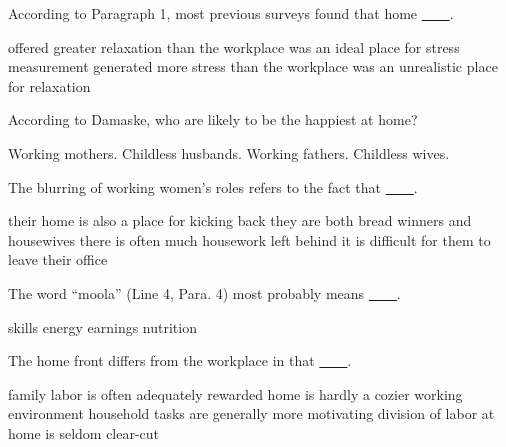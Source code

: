 \item According to Paragraph 1, most previous surveys found that home \uline{~~~~}.
\begin{tasks}
	\task offered greater relaxation than the workplace
	\task was an ideal place for stress measurement
	\task generated more stress than the workplace
	\task was an unrealistic place for relaxation
\end{tasks}
\item According to Damaske, who are likely to be the happiest at home?
\begin{tasks}
	\task Working mothers.
	\task Childless husbands.
	\task Working fathers.
	\task Childless wives.
\end{tasks}
\item The blurring of working women's roles refers to the fact that \uline{~~~~}.
\begin{tasks}
	\task their home is also a place for kicking back
	\task they are both bread winners and housewives
	\task there is often much housework left behind
	\task it is difficult for them to leave their office
\end{tasks}
\item The word ``moola'' (Line 4, Para. 4) most probably means \uline{~~~~}.
\begin{tasks}
	\task skills
	\task energy
	\task earnings
	\task nutrition
\end{tasks}
\item The home front differs from the workplace in that \uline{~~~~}.
\begin{tasks}
	\task family labor is often adequately rewarded
	\task home is hardly a cozier working environment
	\task household tasks are generally more motivating
	\task division of labor at home is seldom clear-cut
\end{tasks}